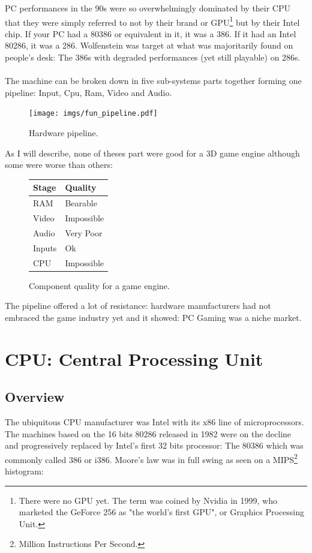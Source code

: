 \documentclass[book.tex]{subfiles}
\begin{document}
PC performances in the 90s were so overwhelmingly dominated by their CPU that they were simply referred to not by their brand or GPU\footnote{There were no GPU yet. The term was coined by Nvidia in 1999, who marketed the GeForce 256 as "the world's first GPU", or Graphics Processing Unit.} but by their Intel chip. If your PC had a 80386 or equivalent in it, it was a 386. If it had an Intel 80286, it was a 286. Wolfenstein was target at what was majoritarily found on people's desk: The 386s with degraded performances (yet still playable) on 286s.\\
\\
The machine can be broken down in five sub-systems parts together forming one pipeline: Input, Cpu, Ram, Video and Audio.\\
 \bigskip
\begin{figure}[H]
\centering
\texttt{[image: imgs/fun\_pipeline.pdf]}
%
\caption{Hardware pipeline.}
\label{fig:digraph}
\end{figure}

As I will describe, none of theses part were good for a 3D game engine although some were worse than others:

 \bigskip

\begin{figure}[H]
\centering
\begin{tabularx}{\textwidth}{ X X  }
  \toprule
  \textbf{Stage} & \textbf{Quality} \\ \bottomrule
  RAM & Bearable \\ 
  Video & Impossible \\ 
  Audio & Very Poor \\ 
  Inputs & Ok \\ 
  CPU & Impossible \\ \bottomrule
\end{tabularx}
\caption{Component quality for a game engine.}
\end{figure}

The pipeline offered a lot of resistance: hardware manufacturers had not embraced the game industry yet and it showed: PC Gaming was a niche market.\\

\section{CPU: Central Processing Unit}
  \subsection{Overview}
  The ubiquitous CPU manufacturer was Intel with its x86 line of microprocessors. The machines based on the 16 bits 80286 released in 1982 were on the decline and progressively replaced by Intel's first 32 bits processor: The 80386 which was commonly called 386 or i386. Moore's law was in full swing as seen on a MIPS\footnote{Million Instructions Per Second.} histogram:
\end{document}
